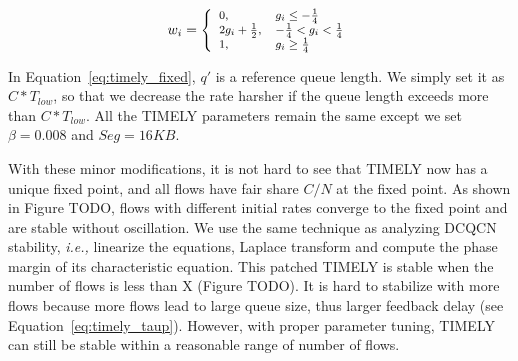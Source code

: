 \begin{equation}
\small
{w_i} = \left\{ \begin{array}{ll}
0, & {g_i \le  - \frac{1}{4}} \\
2{g_i} + \frac{1}{2}, & { - \frac{1}{4} < g_i < \frac{1}{4}} \\
1, & {g_i \ge \frac{1}{4}}
\end{array} \right.
\end{equation}

In Equation~\ref{eq:timely_fixed}, $q'$ is a reference queue length. We simply set it as $C*T_{low}$, 
so that we decrease the rate harsher if the queue length exceeds more than $C*T_{low}$. All the TIMELY
parameters remain the same except we set $\beta=0.008$ and $Seg=16KB$. 

With these minor modifications, it is not hard to see that TIMELY now has a unique fixed point, and all
flows have fair share $C/N$ at the fixed point. As shown in Figure TODO, flows with different initial rates
converge to the fixed point and are stable without oscillation. We use the same technique as analyzing
DCQCN stability, {\em i.e.,} linearize the equations, Laplace transform and compute the phase margin 
of its characteristic equation. This patched TIMELY is stable when the number of flows is less 
than X (Figure TODO). It is hard to stabilize with more flows because more flows lead to large 
queue size, thus larger feedback delay (see Equation~\ref{eq:timely_taup}). However, with proper parameter
tuning, TIMELY can still be stable within a reasonable range of number of flows.